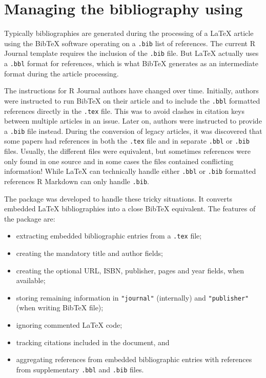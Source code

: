 \section{\texorpdfstring{Managing the bibliography using }{Managing the bibliography using }}\label{rebib}

Typically bibliographies are generated during the processing of a LaTeX article using the BibTeX software \citep{bibtex} operating on a \texttt{.bib} list of references. The current R Journal template requires the inclusion of the \texttt{.bib} file. But LaTeX actually uses a \texttt{.bbl} format for references, which is what BibTeX generates as an intermediate format during the article processing.

The instructions for R Journal authors have changed over time. Initially, authors were instructed to run BibTeX on their article and to include the \texttt{.bbl} formatted references directly in the \texttt{.tex} file. This was to avoid clashes in citation keys between multiple articles in an issue. Later on, authors were instructed to provide a \texttt{.bib} file instead.
During the conversion of legacy articles, it was discovered that some papers had references in both the \texttt{.tex} file and in separate \texttt{.bbl} or \texttt{.bib} files. Usually, the different files were equivalent, but sometimes references were only found in one source and in some cases the files contained conflicting information! While LaTeX can technically handle either \texttt{.bbl} or \texttt{.bib} formatted references R Markdown can only handle \texttt{.bib}.

The  package was developed to handle these tricky situations. It converts embedded LaTeX bibliographies into a close BibTeX equivalent. The features of the package are:

\begin{itemize}
\tightlist
\item
  extracting embedded bibliographic entries from a \texttt{.tex} file;
\item
  creating the mandatory title and author fields;
\item
  creating the optional URL, ISBN, publisher, pages and year fields, when available;
\item
  storing remaining information in \texttt{"journal"} (internally) and \texttt{"publisher"} (when writing BibTeX file);
\item
  ignoring commented LaTeX code;
\item
  tracking citations included in the document, and
\item
  aggregating references from embedded bibliographic entries with references from supplementary \texttt{.bbl} and \texttt{.bib} files.
\end{itemize}

